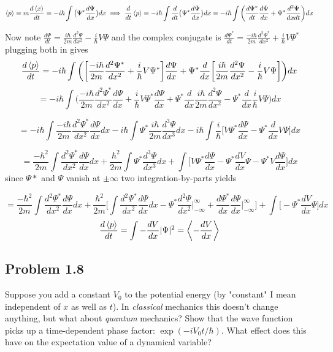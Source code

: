 \documentclass[12pt]{exam}
\begin{document}
\begin{solution}
    $$\expval{p} = m\frac{d\expval{x}}{dt} = -i\hbar \int \big(\Psi^*\frac{d\Psi}{dx}\big)dx \implies \frac{d}{dt}\expval{p} = -i\hbar \int \frac{d}{dt}\big(\Psi^*\frac{d\Psi}{dx}\big)dx = -i\hbar \int \bigg(\frac{d\Psi^*}{dt}\frac{d\Psi}{dx} + \Psi^*\frac{d^2\Psi}{dxdt}\bigg)dx$$
    
    Now note $\frac{d\Psi}{dt} = \frac{i\hbar}{2m}\frac{d^2\Psi}{dx^2} - \frac{i}{\hbar}V\Psi$ and the complex conjugate is $\frac{d\Psi^*}{dt} = \frac{-i\hbar}{2m}\frac{d^2\Psi^*}{dx^2} + \frac{i}{\hbar}V\Psi^*$ plugging both in gives
    $$\frac{d\expval{p}}{dt} = -i\hbar \int \bigg(\bigg[\frac{-i\hbar}{2m}\frac{d^2\Psi^*}{dx^2} + \frac{i}{\hbar}V\Psi^*\bigg]\frac{d\Psi}{dx} + \Psi^*\frac{d}{dx}\bigg[\frac{i\hbar}{2m}\frac{d^2\Psi}{dx^2} - \frac{i}{\hbar}V\Psi\bigg]\bigg)dx $$
    $$= -i\hbar \int \bigg(\frac{-i\hbar}{2m}\frac{d^2\Psi^*}{dx^2}\frac{d\Psi}{dx} + \frac{i}{\hbar}V\Psi^*\frac{d\Psi}{dx} + \Psi^*\frac{d}{dx}\frac{i\hbar}{2m}\frac{d^2\Psi}{dx^2} - \Psi^*\frac{d}{dx}\frac{i}{\hbar}V\Psi\bigg)dx$$
    
    $$= -i\hbar \int \frac{-i\hbar}{2m}\frac{d^2\Psi^*}{dx^2}\frac{d\Psi}{dx} dx -i\hbar \int \Psi^*\frac{i\hbar}{2m}\frac{d^3\Psi}{dx^3} dx  -i\hbar \int\frac{i}{\hbar}\bigg[V\Psi^*\frac{d\Psi}{dx}   - \Psi^*\frac{d}{dx}V\Psi\bigg]dx$$

    $$=  \frac{-\hbar^2}{2m}\int \frac{d^2\Psi^*}{dx^2}\frac{d\Psi}{dx}dx + \frac{\hbar^2}{2m}\int\Psi^*\frac{d^3\Psi}{dx^3} dx + \int\bigg[V\Psi^*\frac{d\Psi}{dx}   - \Psi^*\frac{dV}{dx}\Psi -\Psi^*V\frac{d\Psi}{dx}\bigg]dx$$ 
    since $\Psi*$ and $\Psi$ vanish at $\pm \infty$ two integration-by-parts yields
    
    $$=  \frac{-\hbar^2}{2m}\int \frac{d^2\Psi^*}{dx^2}\frac{d\Psi}{dx}dx + \frac{\hbar^2}{2m} \bigg[\int \frac{d^2\Psi^*}{dx^2}\frac{d\Psi}{dx}dx - \Psi^*\frac{d^2\Psi}{dx^2}\bigg|^\infty_{-\infty} + \frac{d\Psi^*}{dx}\frac{d\Psi}{dx}\bigg|^\infty_{-\infty}\bigg]+ \int\bigg[ - \Psi^*\frac{dV}{dx}\Psi \bigg]dx$$
    $$\frac{d\expval{p}}{dt} = \int -\frac{dV}{dx}|\Psi|^2 = \expval{-\frac{dV}{dx}}$$
\end{solution}


\subsection*{Problem 1.8}
Suppose you add a constant $V_0$ to the potential energy (by "constant" I mean independent of $x$ as well as $t$). In \textit{classical} mechanics this doesn't change anything, but what about \textit{quantum} mechanics? Show that the wave function picks up a time-dependent phase factor: $\exp(-iV_0t/\hbar)$. What effect does this have on the expectation value of a dynamical variable?
\end{document}

